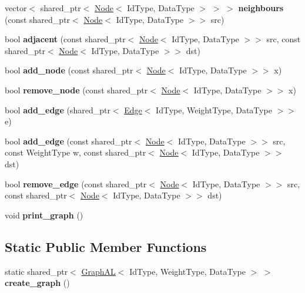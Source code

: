 \begin{DoxyCompactItemize}
vector$<$ shared\+\_\+ptr$<$ \hyperlink{class_node}{Node}$<$ Id\+Type, Data\+Type $>$ $>$ $>$ {\bfseries neighbours} (const shared\+\_\+ptr$<$ \hyperlink{class_node}{Node}$<$ Id\+Type, Data\+Type $>$$>$ src)
\item 
\mbox{\label{class_graph_a_l_a4f665010fabc9093a51366c65b576ee7}} 
bool {\bfseries adjacent} (const shared\+\_\+ptr$<$ \hyperlink{class_node}{Node}$<$ Id\+Type, Data\+Type $>$$>$ src, const shared\+\_\+ptr$<$ \hyperlink{class_node}{Node}$<$ Id\+Type, Data\+Type $>$$>$ dst)
\item 
\mbox{\label{class_graph_a_l_a6a8d8265bb9bbb8d0a819615dc0abd53}} 
bool {\bfseries add\+\_\+node} (const shared\+\_\+ptr$<$ \hyperlink{class_node}{Node}$<$ Id\+Type, Data\+Type $>$$>$ x)
\item 
\mbox{\label{class_graph_a_l_a4f691e44173f90b5ed6d915e60c11408}} 
bool {\bfseries remove\+\_\+node} (const shared\+\_\+ptr$<$ \hyperlink{class_node}{Node}$<$ Id\+Type, Data\+Type $>$$>$ x)
\item 
\mbox{\label{class_graph_a_l_a85bdfd1733b0ca20f770652db632218e}} 
bool {\bfseries add\+\_\+edge} (shared\+\_\+ptr$<$ \hyperlink{class_edge}{Edge}$<$ Id\+Type, Weight\+Type, Data\+Type $>$$>$ e)
\item 
\mbox{\label{class_graph_a_l_ae2dddb7b2a0317a8889568166bdc6993}} 
bool {\bfseries add\+\_\+edge} (const shared\+\_\+ptr$<$ \hyperlink{class_node}{Node}$<$ Id\+Type, Data\+Type $>$$>$ src, const Weight\+Type w, const shared\+\_\+ptr$<$ \hyperlink{class_node}{Node}$<$ Id\+Type, Data\+Type $>$$>$ dst)
\item 
\mbox{\label{class_graph_a_l_a9266a40f808391b712f4e6f36f65dfcf}} 
bool {\bfseries remove\+\_\+edge} (const shared\+\_\+ptr$<$ \hyperlink{class_node}{Node}$<$ Id\+Type, Data\+Type $>$$>$ src, const shared\+\_\+ptr$<$ \hyperlink{class_node}{Node}$<$ Id\+Type, Data\+Type $>$$>$ dst)
\item 
\mbox{\label{class_graph_a_l_ab92a504da660672ae4278db10d2c7a84}} 
void {\bfseries print\+\_\+graph} ()
\end{DoxyCompactItemize}
\subsection*{Static Public Member Functions}
\begin{DoxyCompactItemize}
\item 
\mbox{\label{class_graph_a_l_a5f97f158b843029b5d29b182578b383d}} 
static shared\+\_\+ptr$<$ \hyperlink{class_graph_a_l}{Graph\+AL}$<$ Id\+Type, Weight\+Type, Data\+Type $>$ $>$ {\bfseries create\+\_\+graph} ()
\end{DoxyCompactItemize}
